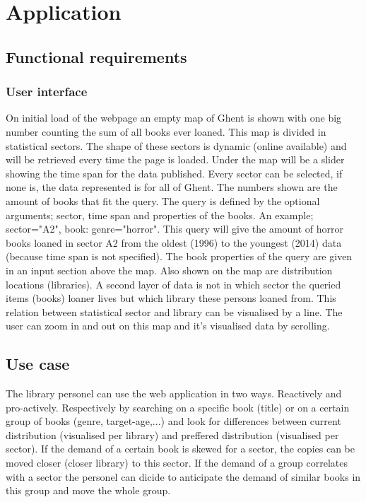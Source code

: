 \chapter{Application}


\section{Functional requirements}

\subsection{User interface}

On initial load of the webpage an empty map of Ghent is shown with one big number counting the sum of all books ever loaned. This map is divided in statistical sectors. The shape of these sectors is dynamic (online available) and will be retrieved every time the page is loaded. Under the map will be a slider showing the time span for the data published. Every sector can be selected, if none is, the data represented is for all of Ghent.  The numbers shown are the amount of books that fit the query. The query is defined by the optional arguments; sector, time span and properties of the books. An example; sector="A2", book: genre="horror". This query will give the amount of horror books loaned in sector A2 from the oldest (1996) to the youngest (2014) data (because time span is not specified). The book properties of the query are given in an input section above the map. Also shown on the map are distribution locations (libraries). A second layer of data is not in which sector the queried items (books) loaner lives but which library these persons  loaned from. This relation between statistical sector and library can be visualised by a line. The user can zoom in and out on this map and it's visualised data by scrolling. 

\section{Use case}

The library personel can use the web application in two ways. Reactively and pro-actively. Respectively by searching on a specific book (title) or on a certain group of books (genre, target-age,...) and look for differences between current distribution (visualised per library) and preffered distribution (visualised per sector). If the demand of a certain book is skewed for a  sector, the copies can be moved closer (closer library) to this sector. If the demand of a group correlates with a sector the personel can dicide to anticipate the demand of similar books in this group and move the whole group. 